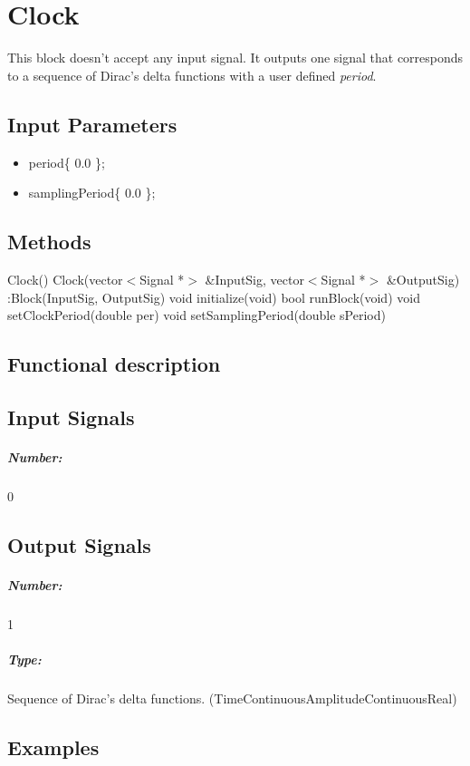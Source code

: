 \clearpage

\section{Clock}

This block doesn't accept any input signal. It outputs one signal that corresponds to a sequence of Dirac's delta functions with a user defined \textit{period}.

\subsection*{Input Parameters}

\begin{itemize}
	\item period\{ 0.0 \};
	\item samplingPeriod\{ 0.0 \};
\end{itemize}

\subsection*{Methods}
 
Clock() {}
\bigbreak
Clock(vector$<$Signal *$>$ \&InputSig, vector$<$Signal *$>$ \&OutputSig) :Block(InputSig, OutputSig) {}
\bigbreak
void initialize(void)
\bigbreak
bool runBlock(void)
\bigbreak
void setClockPeriod(double per)
\bigbreak
void setSamplingPeriod(double sPeriod)

\subsection*{Functional description}


\pagebreak

\subsection*{Input Signals}

\subparagraph*{Number:} 0

\subsection*{Output Signals}

\subparagraph*{Number:} 1

\subparagraph*{Type:} Sequence of Dirac's delta functions. (TimeContinuousAmplitudeContinuousReal)

\subsection*{Examples} 

